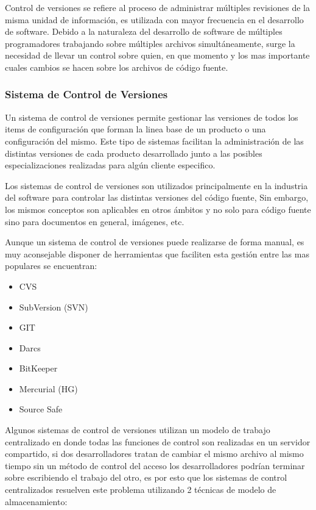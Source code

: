 Control de versiones se refiere al proceso de administrar múltiples revisiones de la misma unidad de información, es utilizada con mayor frecuencia en el desarrollo de software.
Debido a la naturaleza del desarrollo de software de múltiples programadores trabajando sobre múltiples archivos simultáneamente, surge la necesidad de llevar un control sobre quien, en que momento y los mas importante cuales cambios se hacen sobre los archivos de código fuente.


\subsubsection*{Sistema de Control de Versiones}

Un sistema de control de versiones permite gestionar las versiones de todos los items de configuración que forman la linea base de un producto o una configuración del mismo. Este tipo de sistemas facilitan la administración de las distintas versiones de cada producto desarrollado junto a las posibles especializaciones realizadas para algún cliente especifico.

Los sistemas de control de versiones son utilizados principalmente en la industria del software para controlar las distintas versiones del código fuente, Sin embargo, los mismos conceptos son aplicables en otros ámbitos y no solo para código fuente sino para documentos en general, imágenes, etc.

Aunque un sistema de control de versiones puede realizarse de forma manual, es muy aconsejable disponer de herramientas que faciliten esta gestión entre las mas populares se encuentran:

\begin{itemize}

	\item CVS \cite{cvs}
	\item SubVersion (SVN) \cite{svn}
	\item GIT \cite{git}
	\item Darcs \cite{darcs}
	\item BitKeeper \cite{bitkeeper}
	\item Mercurial (HG) \cite{mercurial}
	\item Source Safe \cite{ssafe}

\end{itemize}


Algunos sistemas de control de versiones utilizan un modelo de trabajo centralizado en donde todas las funciones de control son realizadas en un servidor compartido, si dos desarrolladores tratan de cambiar el mismo archivo al mismo tiempo sin un método de control del acceso los desarrolladores podrían terminar sobre escribiendo el trabajo del otro, es por esto que los sistemas de control centralizados resuelven este problema utilizando 2 técnicas de modelo de almacenamiento:

